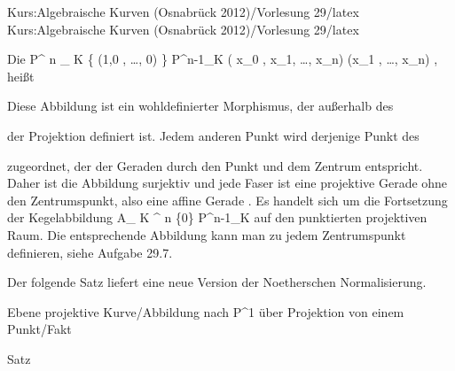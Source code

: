 Kurs:Algebraische Kurven (Osnabrück 2012)/Vorlesung 29/latex
Kurs:Algebraische Kurven (Osnabrück 2012)/Vorlesung 29/latex

\setcounter{section}{29}





{}

{


Die
\maabbeledisp {} { {\mathbb P}^{ n }_{ K} \setminus \{ (1,0 , \ldots , 0) \}
} { {\mathbb P}^{n-1}_{K}
} { ( x_0 , x_1, \ldots ,  x_n)
} { (x_1 , \ldots , x_n)
} {,}
heißt 



}


Diese Abbildung ist ein wohldefinierter Morphismus, der außerhalb des  {}

 der Projektion definiert ist. Jedem anderen Punkt wird derjenige Punkt des

 zugeordnet, der der Geraden durch den Punkt und dem Zentrum entspricht. Daher ist die Abbildung surjektiv und jede Faser ist eine projektive Gerade ohne den Zentrumspunkt, also eine affine Gerade
 {} {.}
Es handelt sich um die Fortsetzung der Kegelabbildung
\maabbdisp {} {{ {\mathbb A}_{ K }^{ n  } } \setminus \{0\}} { {\mathbb P}^{n-1}_{K}
} {}
auf den punktierten projektiven Raum. Die entsprechende Abbildung kann man zu jedem Zentrumspunkt definieren, siehe
Aufgabe 29.7.




Der folgende Satz liefert eine neue Version
der Noetherschen Normalisierung.



{Ebene projektive Kurve/Abbildung nach P^1 über Projektion von einem Punkt/Fakt}

{Satz}

{}

